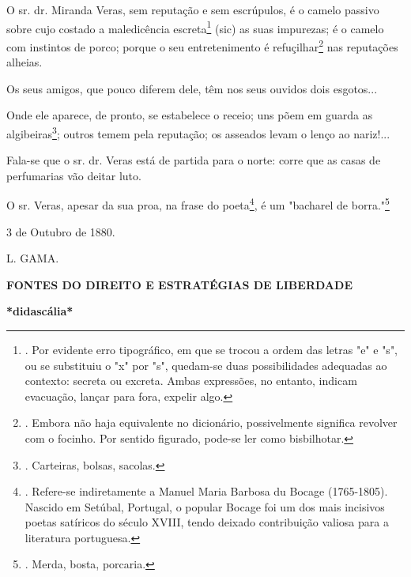 O sr. dr. Miranda Veras, sem reputação e sem escrúpulos, é o camelo
passivo sobre cujo costado a maledicência escreta\footnote{. Por
  evidente erro tipográfico, em que se trocou a ordem das letras "e" e
  "s", ou se substituiu o "x" por "s", quedam-se duas possibilidades
  adequadas ao contexto: secreta ou excreta. Ambas expressões, no
  entanto, indicam evacuação, lançar para fora, expelir algo.} (sic) as
suas impurezas; é o camelo com instintos de porco; porque o seu
entretenimento é refuçilhar\footnote{. Embora não haja equivalente no
  dicionário, possivelmente significa revolver com o focinho. Por
  sentido figurado, pode-se ler como bisbilhotar.} nas reputações
alheias.

Os seus amigos, que pouco diferem dele, têm nos seus ouvidos dois
esgotos...

Onde ele aparece, de pronto, se estabelece o receio; uns põem em guarda
as algibeiras\footnote{. Carteiras, bolsas, sacolas.}; outros temem pela
reputação; os asseados levam o lenço ao nariz!...

Fala-se que o sr. dr. Veras está de partida para o norte: corre que as
casas de perfumarias vão deitar luto.

O sr. Veras, apesar da sua proa, na frase do poeta\footnote{. Refere-se
  indiretamente a Manuel Maria Barbosa du Bocage (1765-1805). Nascido em
  Setúbal, Portugal, o popular Bocage foi um dos mais incisivos poetas
  satíricos do século XVIII, tendo deixado contribuição valiosa para a
  literatura portuguesa.}, é um "bacharel de borra."\footnote{. Merda,
  bosta, porcaria.}

3 de Outubro de 1880.

L. GAMA.

\textbf{FONTES DO DIREITO E
ESTRATÉGIAS DE LIBERDADE}

\textbf{*didascália*}

